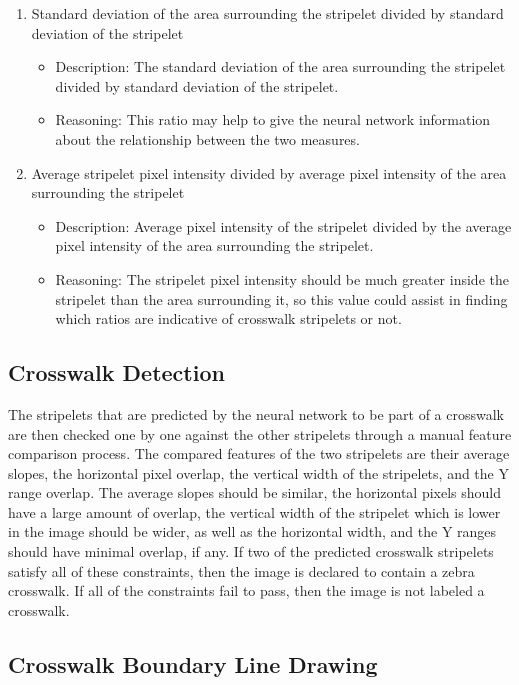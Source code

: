 \documentclass[12pt]{ucthesis}
\begin{document}
\begin{enumerate}
      \item Standard deviation of the area surrounding the stripelet divided by standard deviation of the stripelet
   \begin{itemize}
     \item Description: The standard deviation of the area surrounding the stripelet divided by standard deviation of the stripelet.
     \item Reasoning: This ratio may help to give the neural network information about the relationship between the two measures.
   \end{itemize}
   \item Average stripelet pixel intensity divided by average pixel intensity of the area surrounding the stripelet
   \begin{itemize}
     \item Description: Average pixel intensity of the stripelet divided by the average pixel intensity of the area surrounding the stripelet.
     \item Reasoning: The stripelet pixel intensity should be much greater inside the stripelet than the area surrounding it, so this value could assist in finding which ratios are indicative of crosswalk stripelets or not. 
   \end{itemize}
\end{enumerate}

\subsection{Crosswalk Detection}

The stripelets that are predicted by the neural network to be part of a crosswalk are then checked one by one against the other stripelets through a manual feature comparison process. The compared features of the two stripelets are their average slopes, the horizontal pixel overlap, the vertical width of the stripelets, and the Y range overlap. The average slopes should be similar, the horizontal pixels should have a large amount of overlap, the vertical width of the stripelet which is lower in the image should be wider, as well as the horizontal width, and the Y ranges should have minimal overlap, if any. If two of the predicted crosswalk stripelets satisfy all of these constraints, then the image is declared to contain a zebra crosswalk. If all of the constraints fail to pass, then the image is not labeled a crosswalk. 

\subsection{Crosswalk Boundary Line Drawing}
\end{document}
